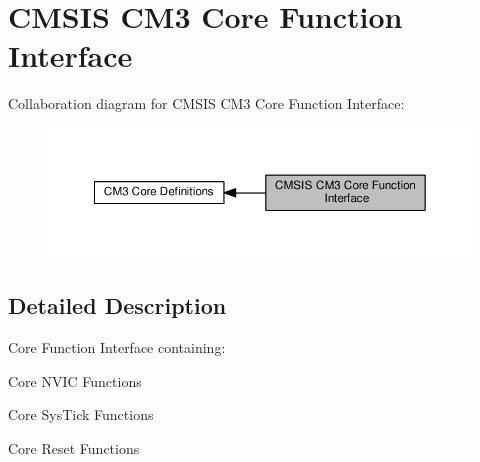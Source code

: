 \hypertarget{group__CMSIS__CM3__Core__FunctionInterface}{}\section{C\+M\+S\+IS C\+M3 Core Function Interface}
\label{group__CMSIS__CM3__Core__FunctionInterface}
Collaboration diagram for C\+M\+S\+IS C\+M3 Core Function Interface\+:\nopagebreak
\begin{figure}[H]
\begin{center}
\leavevmode
\includegraphics[width=350pt]{d1/de3/group__CMSIS__CM3__Core__FunctionInterface}
\end{center}
\end{figure}


\subsection{Detailed Description}
Core Function Interface containing\+:
\begin{DoxyItemize}
\item Core N\+V\+IC Functions
\item Core Sys\+Tick Functions
\item Core Reset Functions 
\end{DoxyItemize}